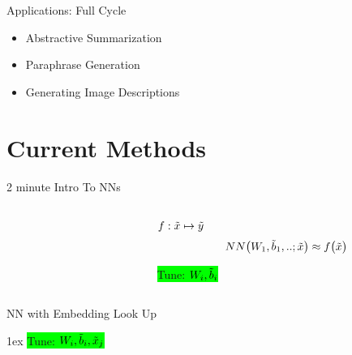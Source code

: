 \documentclass[12pt,landscape,english]{beamer}
\begin{document}
\begin{frame}{Applications: Full Cycle} 
	\centering{}
	\begin{itemize}
		\item Abstractive Summarization
		\item Paraphrase Generation 
		\item Generating Image Descriptions
	\end{itemize}
\end{frame}


\section{Current Methods}
\begin{frame} {2 minute Intro To NNs}
	\begin{columns} 
	\begin{column}{0.5\textwidth}
		\centering
	\end{column}
	\begin{column}{0.5\textwidth}
	
			$f:\tilde{x}\mapsto\tilde{y}$
			$$NN\big(W_1,\tilde{b}_1,..;\tilde{x}\big)\approx f \big(\tilde{x}\big)$$

		\colorbox{lime}{Tune:	$W_i,\tilde{b}_i$}

	\end{column}
	\end{columns}
\end{frame}

\begin{frame} {NN with Embedding Look Up}
	\centering\resizebox{!}{0.7\textheight}{}
	
	\rightskip 1ex \colorbox{lime}{Tune:	$W_i,\tilde{b}_i,\tilde{x}_j$}
\end{frame}
\end{document}
